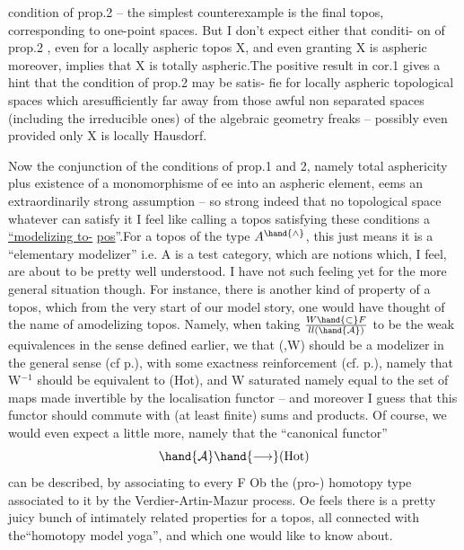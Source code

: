 condition of prop.2 -- the simplest counterexample is the final topos,
corresponding to one-point spaces. But I don't expect either that conditi-%
on of prop.2 , even for a locally aspheric topos X, and even granting
X is aspheric moreover, implies that X is totally aspheric.The positive 
result in cor.1 gives a hint that the condition of prop.2 may be satis-%
fie for locally aspheric topological spaces which aresufficiently far
away from those awful non separated spaces (including the irreducible ones)
of the algebraic geometry freaks -- possibly even  provided only
X is locally Hausdorf.

 Now the conjunction of the conditions of prop.1 and 2,  namely
total asphericity plus \hand{\unsure{*}}existence of  a monomorphisme of
e\hand{$\amalg$}e into an aspheric element, eems an extraordinarily strong assumption
-- so strong indeed that no topological space whatever can satisfy it\hand{!}
I feel like calling a topos satisfying these conditions a \uline{``modelizing to-}%
\uline{pos}''.For a topos of the type $A^{\hand{\wedge}}$, this just means it is a ``elementary 
modelizer'' i.e. A is a test category, which are notions which, I feel, are
about to be pretty well understood. I have not such feeling yet for the
more general situation though. For instance, there is another kind of
property of a topos, which from the very start of our model story, one
would have thought of  the name of amodelizing topos. Namely, when
taking $W \hand{\subset} F\over{l}{l}(\hand{\mathcal{A}})$ to be the weak equivalences in the sense defined earlier,
we  that  (,W) should be a modelizer in the general sense
(cf p.), with some exactness reinforcement (cf. p.), namely that
W$^{-1}$ should be equivalent to (Hot), and W saturated namely equal to the
set of maps made invertible by the localisation functor -- and moreover
I guess that this functor should commute with (at least finite) sums and
products. Of course, we would even expect a little more, namely that
the ``canonical functor''
\[ \hand{\mathcal{A}} \hand{\longrightarrow} (\mathrm{Hot}) \]
can be described, by associating to every F \hand{$\in$} Ob the (pro-) homotopy
type associated to it by the Verdier-Artin-Mazur process. Oe feels
there is a pretty juicy bunch of intimately related properties for a topos,
all connected with the``homotopy model yoga'', and which one would like to
know about.

